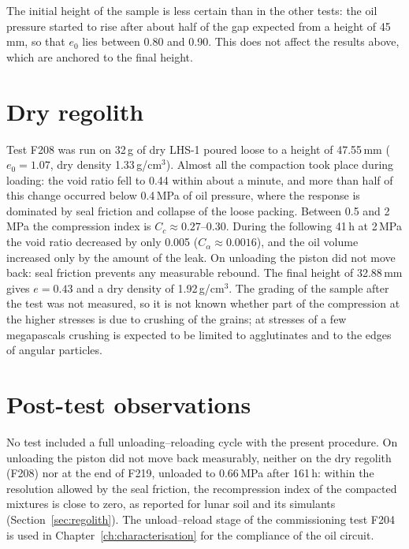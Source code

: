 The initial height of the sample is less certain than in the other tests: the oil pressure started to rise after about half of the gap expected from a height of 45\,mm, so that $e_0$ lies between 0.80 and 0.90. This does not affect the results above, which are anchored to the final height.

\section{Dry regolith}
\label{sec:results_dry}

Test F208 was run on 32\,g of dry LHS-1 poured loose to a height of 47.55\,mm ($e_0 = 1.07$, dry density 1.33\,g/cm$^3$). Almost all the compaction took place during loading: the void ratio fell to 0.44 within about a minute, and more than half of this change occurred below 0.4\,MPa of oil pressure, where the response is dominated by seal friction and collapse of the loose packing. Between 0.5 and 2\,MPa the compression index is $C_c\approx0.27$--0.30. During the following 41\,h at 2\,MPa the void ratio decreased by only 0.005 ($C_\alpha\approx0.0016$), and the oil volume increased only by the amount of the leak. On unloading the piston did not move back: seal friction prevents any measurable rebound. The final height of 32.88\,mm gives $e = 0.43$ and a dry density of 1.92\,g/cm$^3$. The grading of the sample after the test was not measured, so it is not known whether part of the compression at the higher stresses is due to crushing of the grains; at stresses of a few megapascals crushing is expected to be limited to agglutinates and to the edges of angular particles.

\section{Post-test observations}
\label{sec:results_posttest}

No test included a full unloading--reloading cycle with the present procedure. On unloading the piston did not move back measurably, neither on the dry regolith (F208) nor at the end of F219, unloaded to 0.66\,MPa after 161\,h: within the resolution allowed by the seal friction, the recompression index of the compacted mixtures is close to zero, as reported for lunar soil and its simulants (Section~\ref{sec:regolith}). The unload--reload stage of the commissioning test F204 is used in Chapter~\ref{ch:characterisation} for the compliance of the oil circuit.


